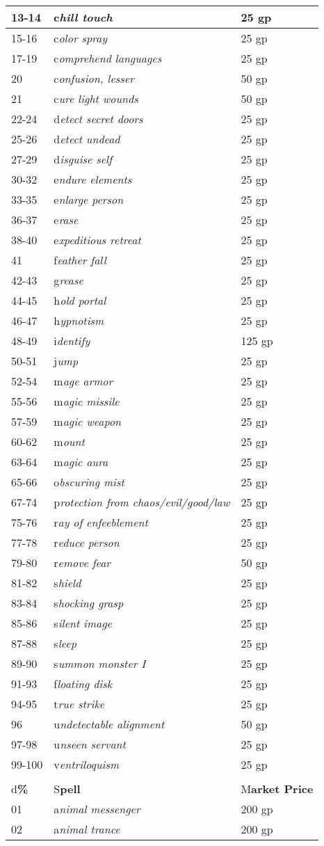 \documentclass{article}
\begin{document}
\begin{tabular}{|>{\raggedright}p{28pt}|>{\raggedright}p{200pt}|>{\raggedright}p{85pt}|}
\hline
13-14 & c\textit{hill touch} & 25 gp\tabularnewline
\hline
15-16 & c\textit{olor spray} & 25 gp\tabularnewline
\hline
17-19 & c\textit{omprehend languages} & 25 gp\tabularnewline
\hline
20 & c\textit{onfusion, lesser} & 50 gp\tabularnewline
\hline
21 & c\textit{ure light wounds} & 50 gp\tabularnewline
\hline
22-24 & d\textit{etect secret doors} & 25 gp\tabularnewline
\hline
25-26 & d\textit{etect undead} & 25 gp\tabularnewline
\hline
27-29 & d\textit{isguise self} & 25 gp\tabularnewline
\hline
30-32 & e\textit{ndure elements} & 25 gp\tabularnewline
\hline
33-35 & e\textit{nlarge person} & 25 gp\tabularnewline
\hline
36-37 & e\textit{rase} & 25 gp\tabularnewline
\hline
38-40 & e\textit{xpeditious retreat} & 25 gp\tabularnewline
\hline
41 & f\textit{eather fall} & 25 gp\tabularnewline
\hline
42-43 & g\textit{rease} & 25 gp\tabularnewline
\hline
44-45 & h\textit{old portal} & 25 gp\tabularnewline
\hline
46-47 & h\textit{ypnotism} & 25 gp\tabularnewline
\hline
48-49 & i\textit{dentify} & 125 gp\tabularnewline
\hline
50-51 & j\textit{ump} & 25 gp\tabularnewline
\hline
52-54 & m\textit{age armor} & 25 gp\tabularnewline
\hline
55-56 & m\textit{agic missile} & 25 gp\tabularnewline
\hline
57-59 & m\textit{agic weapon} & 25 gp\tabularnewline
\hline
60-62 & m\textit{ount} & 25 gp\tabularnewline
\hline
63-64 & m\textit{agic aura} & 25 gp\tabularnewline
\hline
65-66 & o\textit{bscuring mist} & 25 gp\tabularnewline
\hline
67-74 & p\textit{rotection from chaos/evil/good/law} & 25 gp\tabularnewline
\hline
75-76 & r\textit{ay of enfeeblement} & 25 gp\tabularnewline
\hline
77-78 & r\textit{educe person} & 25 gp\tabularnewline
\hline
79-80 & r\textit{emove fear} & 50 gp\tabularnewline
\hline
81-82 & s\textit{hield} & 25 gp\tabularnewline
\hline
83-84 & s\textit{hocking grasp} & 25 gp\tabularnewline
\hline
85-86 & s\textit{ilent image} & 25 gp\tabularnewline
\hline
87-88 & s\textit{leep} & 25 gp\tabularnewline
\hline
89-90 & s\textit{ummon monster I} & 25 gp\tabularnewline
\hline
91-93 & f\textit{loating disk} & 25 gp\tabularnewline
\hline
94-95 & t\textit{rue strike} & 25 gp\tabularnewline
\hline
96 & u\textit{ndetectable alignment} & 50 gp\tabularnewline
\hline
97-98 & u\textit{nseen servant} & 25 gp\tabularnewline
\hline
99-100 & v\textit{entriloquism} & 25 gp\tabularnewline
\hline
\multicolumn{3}{|p{314pt}|}{2\textit{\textbf{nd-Level Arcane Spells}}}\tabularnewline
\hline
d\textbf{\%} & S\textbf{pell} & M\textbf{arket Price}\tabularnewline
\hline
01 & a\textit{nimal messenger} & 200 gp\tabularnewline
\hline
02 & a\textit{nimal trance} & 200 gp\tabularnewline
\hline

\end{tabular}
\end{document}
